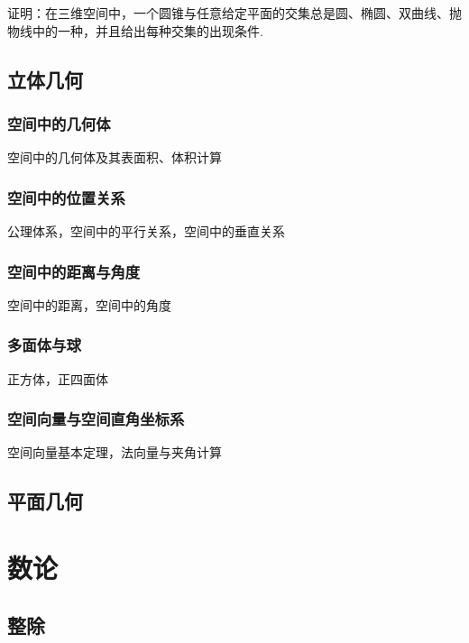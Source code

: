 \documentclass[lang=cn, zihao=5]{elegantbook}
\begin{document}
\begin{problem}
	证明：在三维空间中，一个圆锥与任意给定平面的交集总是圆、椭圆、双曲线、抛物线中的一种，并且给出每种交集的出现条件.
\end{problem}


\chapter{立体几何}

\section{空间中的几何体}

空间中的几何体及其表面积、体积计算

\section{空间中的位置关系}

公理体系，空间中的平行关系，空间中的垂直关系

\section{空间中的距离与角度}

空间中的距离，空间中的角度

\section{多面体与球}

正方体，正四面体

\section{空间向量与空间直角坐标系}

空间向量基本定理，法向量与夹角计算

\chapter{平面几何}

\part{数论}

\chapter{整除}
\end{document}
